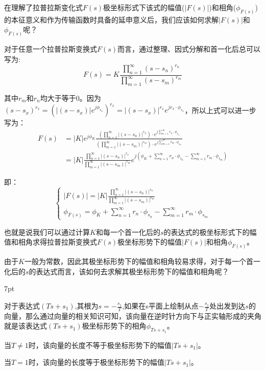 \documentclass{article}
\numberwithin{equation}{section}
\numberwithin{figure}{section}
\newenvironment{formal}{%
\def\FrameCommand{%
\hspace{1pt}%
{\color{DarkBlue}\vrule width 2pt}%
{\color{formalshade}\vrule width 4pt}%
\colorbox{formalshade}%
}%
\MakeFramed{\advance\hsize-\width\FrameRestore}%
\noindent\hspace{-4.55pt}%
\begin{adjustwidth}{}{7pt}%
\vspace{2pt}\vspace{2pt}%
}
{%
\vspace{2pt}\end{adjustwidth}\endMakeFramed%
}
\begin{document}
在理解了拉普拉斯变化式$F(s)$极坐标形式下该式的幅值($|F(s)|$)和相角($\phi_{F(s)}$)的本征意义和作为传输函数时具备的延申意义后，我们应该如何求解$|F(s)|$和$\phi_{F(s)}$呢？

对于任意一个拉普拉斯变换式$F(s)$而言，通过整理、因式分解和首一化后总可以写为:
\begin{equation}
    F(s)=K\frac{\prod_{n=1}^{\infty}(s-s_n)^{r_n}}{\prod_{m=1}^{\infty}(s-s_m)^{r_m}}
\end{equation}

其中$r_m$和$r_n$均大于等于0。因为$(s-s_x)^{r_x}=(|(s-s_x)|e^{j\phi_{s_x}})^{r_x}=|(s-s_x)|^{r_x}e^{jr_x·\phi_{s_x}}$，所以上式可以进一步写为：
\begin{equation}
    \begin{split}
        F(s)&=|K|e^{j\phi_K}\frac{(\prod_{n=1}^{\infty}|(s-s_n)|^{r_n})·e^{j\sum_{n=1}^{\infty}r_n·\phi_{s_n}}}{(\prod_{m=1}^{\infty}|(s-s_m)|^{r_m})·e^{j\sum_{m=1}^{\infty}r_m·\phi_{s_m}}}\\
        &=|K|\frac{\prod_{n=1}^{\infty}|(s-s_n)|^{r_n}}{\prod_{m=1}^{\infty}|(s-s_m)|^{r_m}}e^{j(\phi_K+\sum_{n=1}^{\infty}r_n·\phi_{s_n}-\sum_{m=1}^{\infty}r_m·\phi_{s_m})}
    \end{split}
\end{equation}

即：
\begin{equation}
    \begin{cases}
        |F(s)|=|K|\frac{\prod_{n=1}^{\infty}|(s-s_n)|^{r_n}}{\prod_{m=1}^{\infty}|(s-s_m)|^{r_m}}\\
        \phi_{F(s)}=\phi_K+\sum_{n=1}^{\infty}r_n·\phi_{s_n}-\sum_{m=1}^{\infty}r_m·\phi_{s_m}
    \end{cases}\label{laplacepolarcoordinate}
\end{equation}

也就是说我们可以通过计算$K$和每一个首一化后的$s$的表达式的极坐标形式下的幅值和相角求得拉普拉斯变换式$F(s)$极坐标形势下的幅值$|F(s)|$和相角$\phi_{F(s)}$。

由于$K$一般为常数，因此其极坐标形势下的幅值和相角较易求得，对于每一个首一化后的$s$的表达式而言，该如何去求解其极坐标形势下的幅值和相角呢？
\begin{formal}
    对于表达式$(Ts+s_1)$,其根为$s=-\frac{s_1}{T}$,如果在s平面上绘制从点$-\frac{s_1}{T}$处出发到达$s$的向量，那么通过向量的相关知识可知，该向量在逆时针方向下与正实轴形成的夹角就是该表达式$(Ts+s_1)$极坐标形势下的相角$\phi_{Ts+s_1}$。

    当$T\neq 1$时，该向量的长度不等于极坐标形势下的幅值$|Ts+s_1|$。

    当$T=1$时，该向量的长度等于极坐标形势下的幅值$|Ts+s_1|$。
\end{formal}
\end{document}
